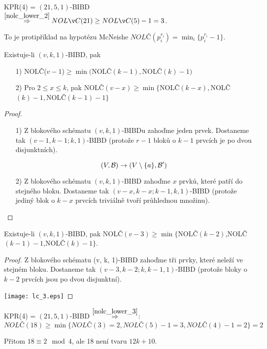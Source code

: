 \begin{example}
	KPR(4) = $(21, 5, 1)$-BIBD $\stackrel{\cref{nolc_lower_2}}{\Rightarrow}NOLČ(21) \geq NOLČ(5) - 1 = 3$.

	To je protipříklad na hypotézu McNeishe $NOLČ(p_i^{r_i}) = \min_i \{ p_i^{r_i} - 1 \}$.
\end{example}

\begin{theorem}
    Existuje-li $(v,k,1)$-BIBD, pak
    \begin{itemize}
        \item[1)] NOLČ($v-1$)$\geq\min($NOLČ$(k-1),$NOLČ$(k)-1)$
        \item[2)] Pro $2\leq x\leq k$, pak NOLČ$(v-x)\geq\min\{$NOLČ$(k-x),$NOLČ$(k)-1,$NOLČ$(k-1)-1\}$
    \end{itemize}
\end{theorem}
\begin{proof}
    \begin{itemize}
        \item[1)]  Z blokového schématu $(v, k, 1)$-BIBDu zahoďme jeden prvek.
		Dostaneme tak $(v-1, k - 1; k, 1)$-BIBD (protože $r - 1$ bloků o $k - 1$ prvcích je po dvou disjunktních).

		\[ (V, \operatorname{\mathcal{B}}) \to (V \setminus \{ a \}, \operatorname{\mathcal{B}}^{\prime}) \]

        \item[2)] Z blokového schématu $(v, k, 1)$-BIBD zahoďme $x$ prvků, které patří do stejného bloku.
		Dostaneme tak $(v - x, k - x; k - 1, k, 1)$-BIBD (protože jediný blok o $k - x$ prvcích triviálně tvoří průhlednou množinu).

    \end{itemize}
\end{proof}

\begin{theorem}\label{nolc_lower_3}
    Existuje-li $(v,k,1)$-BIBD, pak NOLČ$(v-3)\geq\min\{$NOLČ$(k-2)$,NOLČ$(k-1)-1$,NOLČ$(k)-1\}$.
\end{theorem}
\begin{proof}
	Z blokového schématu (v, k, 1)-BIBD zahoďme tři prvky, které neleží ve stejném bloku.
	Dostaneme tak $(v - 3, k - 2; k, k - 1, 1)$-BIBD (protože bloky o $k - 2$ prvcích jsou po dvou disjunktní).

	\texttt{[image: lc\_3.eps]}
\end{proof}

\begin{example}
	KPR(4) = $(21, 5, 1)$-BIBD $\stackrel{\cref{nolc_lower_3}}{\Rightarrow}$:
	\[ NOLČ(18) \geq \min \{ NOLČ(3) = 2, NOLČ(5) - 1 = 3, NOLČ(4) - 1 = 2 \} = 2 \]

	Přitom $18 \equiv 2 \mod 4$, ale 18 není tvaru $12k + 10$.
\end{example}

